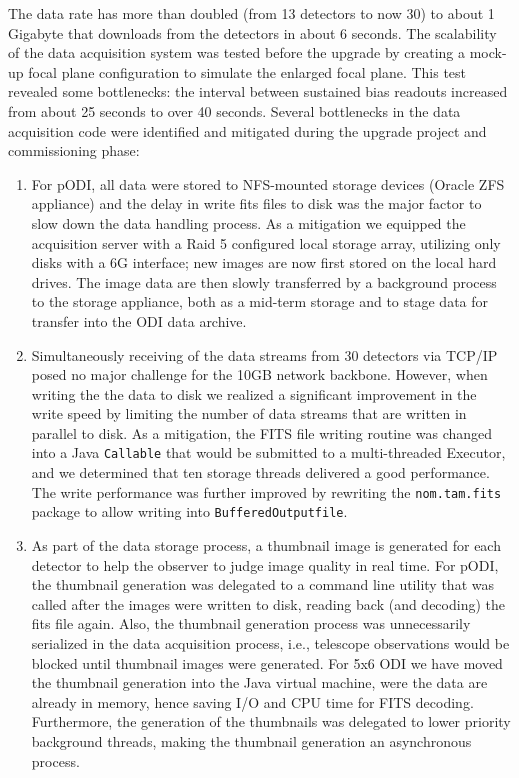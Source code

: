 \documentclass[]{spieman}
\begin{document}
The data rate has more than doubled (from 13 detectors to now 30) to about 1
Gigabyte that downloads from the detectors in about 6 seconds.  The scalability
of the data acquisition system was tested before the upgrade by creating a
mock-up focal plane  configuration to simulate the enlarged focal plane. This
test revealed some bottlenecks: the interval between sustained bias readouts
increased from about 25 seconds to over 40 seconds. Several bottlenecks in the
data acquisition code were identified and mitigated during the upgrade project
and commissioning phase:


\begin{enumerate} 
    
\item For pODI, all data were stored to NFS-mounted storage devices (Oracle ZFS
appliance) and the delay in  write fits files to disk was the major factor to
slow down the data handling process. As a mitigation we equipped the acquisition
server with a Raid 5 configured local storage array, utilizing only disks with a
6G interface; new images are now first stored on the local hard drives. The
image data are then slowly transferred by a background process to the storage
appliance, both as a mid-term storage and to stage data for transfer into the
ODI data archive.

\item   Simultaneously receiving of the data streams from 30 detectors via
TCP/IP posed no major challenge for the 10GB network backbone.  However, when
writing the the data to disk we realized a significant  improvement in the write
speed by limiting the number of data streams that are written in parallel to
disk. As a mitigation, the FITS file writing routine was changed into a Java
{\tt Callable} that would be submitted to a multi-threaded Executor, and we
determined that ten storage threads delivered a good performance. The write
performance was further improved by rewriting the {\tt nom.tam.fits} package to
allow writing into {\tt BufferedOutputfile}.

\item As part of the data storage process, a thumbnail image is generated for
each detector to help the observer to judge image quality in real time. For
pODI, the thumbnail generation was delegated to a command line utility that was
called after the images were written to disk, reading back (and decoding) the
fits file again. Also, the thumbnail generation process was unnecessarily
serialized in the data acquisition process, i.e., telescope observations would
be blocked until thumbnail images were generated.  For 5x6 ODI we have moved the
thumbnail generation into the Java virtual machine, were the data are already in
memory, hence saving I/O and CPU time for FITS decoding. Furthermore, the
generation of the thumbnails was delegated to  lower priority background
threads, making the thumbnail generation an asynchronous process.

    
\end{enumerate}
\end{document}
